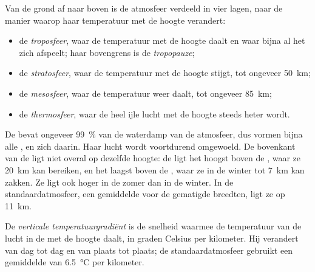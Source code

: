 \begin{definition}\label{def:g8:the-atmosphere:layers}
Van de grond af naar boven is de atmosfeer verdeeld in vier lagen, naar de
manier waarop haar temperatuur met de hoogte verandert:
\begin{itemize}
  \item de \emph{troposfeer}, waar de temperatuur met de
        hoogte daalt en waar bijna al het  zich afspeelt; haar
        bovengrens is de \emph{tropopauze};
  \item de \emph{stratosfeer}, waar de temperatuur met
        de hoogte stijgt, tot ongeveer \qty{50}{km};
  \item de \emph{mesosfeer}, waar de temperatuur weer
        daalt, tot ongeveer \qty{85}{km};
  \item de \emph{thermosfeer}, waar de heel ijle lucht
        met de hoogte steeds heter wordt.
\end{itemize}
\end{definition}

De  bevat ongeveer 99~\% van de waterdamp van de atmosfeer, dus
vormen bijna alle ,  en  zich daarin. Haar lucht wordt
voortdurend omgewoeld. De bovenkant van de  ligt niet overal op
dezelfde hoogte: de  ligt het hoogst boven de , waar ze
\qty{20}{km} kan bereiken, en het laagst boven de , waar ze in de
winter tot \qty{7}{km} kan zakken. Ze ligt ook hoger in de zomer dan in de
winter. In de standaardatmosfeer, een gemiddelde voor de gematigde
breedten, ligt ze op \qty{11}{km}.

\begin{definition}\label{def:g8:the-atmosphere:lapse-rate}
De \emph{verticale temperatuurgradiënt}
is de snelheid waarmee de temperatuur van de lucht in de  met de
hoogte daalt, in graden Celsius per kilometer. Hij verandert van dag tot
dag en van plaats tot plaats; de standaardatmosfeer gebruikt een
gemiddelde van \qty{6.5}{\degreeCelsius} per kilometer.
\end{definition}

